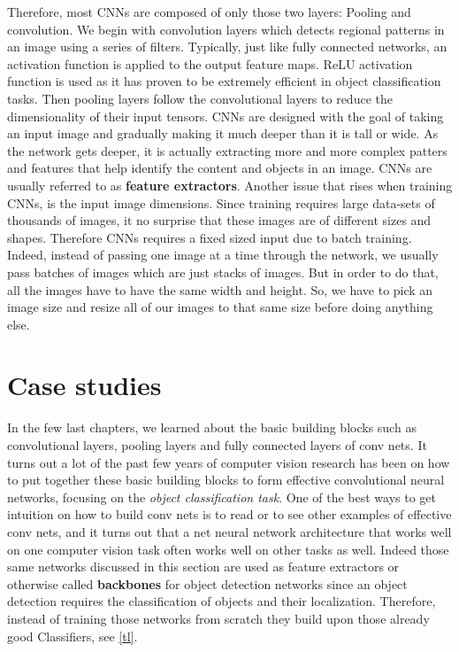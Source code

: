 Therefore, most CNNs are composed of only those two layers: Pooling and convolution. We begin with convolution layers which detects regional patterns
in an image using a series of filters. Typically, just like fully connected networks, an activation function is applied to the output feature maps.
ReLU activation function is used as it has proven to be extremely efficient in object classification tasks. Then pooling layers follow the
convolutional layers to reduce the dimensionality of their input tensors. CNNs are designed with the goal of taking an input image and gradually
making it much deeper than it is tall or wide. As the network gets deeper, it is actually extracting more and more complex patters and features that
help identify the content and objects in an image. CNNs are usually referred to as \textbf{feature extractors}. Another issue that rises when
training CNNs, is the input image dimensions. Since training requires large data-sets of thousands of images, it no surprise that these images
are of different sizes and shapes. Therefore CNNs requires a fixed sized input due to batch training. Indeed, instead of passing one image at a time
through the network, we usually pass batches of images which are just stacks of images. But in order to do that, all the images have to have the
same width and height. So, we have to pick an image size and resize all of our images to that same size before doing anything else.

\section{Case studies}

 In the few last chapters, we learned about the basic building blocks such as convolutional layers, pooling layers and fully connected layers of conv nets. It turns out a lot of the past few years of computer vision research has been on how to put together these basic building blocks to form effective convolutional neural networks, focusing on the \emph{object classification task}. One of the best ways to get intuition on how to build conv nets is to read or to see other examples of effective conv nets, and it turns out that a net neural network architecture that works well on one computer vision task often works well on other tasks as well. Indeed those same networks discussed in this section are used as feature extractors or otherwise called \textbf{backbones} for object detection networks since an object detection requires the classification of objects and their localization. Therefore, instead of training those networks from scratch they build upon those already good Classifiers, see \cref{tl}.

